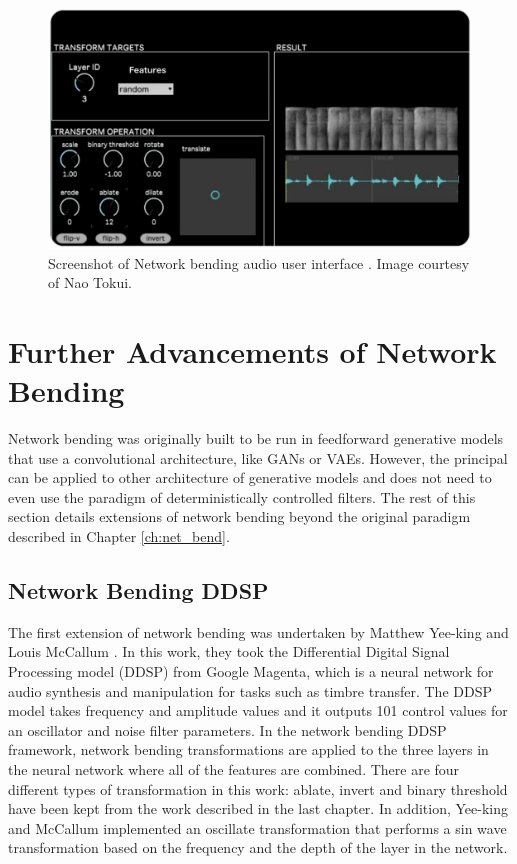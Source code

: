 \begin{figure}[!htb]
    \centering
    \captionsetup{justification=centering}
    \includegraphics[width=1\textwidth]{figures/c7_impact/net-bend-technical/nao-tokui-stylegan-audio.png}
    \caption[Network bending audio user interface]{Screenshot of Network bending audio user interface \citep{tokui2023bending}. Image courtesy of Nao Tokui.}
    \label{fig:c7:net-bend-nao-tokui}
\end{figure}

\section{Further Advancements of Network Bending}

Network bending was originally built to be run in feedforward generative models that use a convolutional architecture, like GANs or VAEs. 
However, the principal can be applied to other architecture of generative models and does not need to even use the paradigm of deterministically controlled filters. 
The rest of this section details extensions of network bending beyond the original paradigm described in Chapter \ref{ch:net_bend}.

\subsection{Network Bending DDSP}
\label{c7:subsubsec:ddsp}


The first extension of network bending was undertaken by Matthew Yee-king and Louis McCallum \citep{mccallum2020network,yee2021studio}. 
In this work, they took the Differential Digital Signal Processing model (DDSP) from Google Magenta, which is a neural network for audio synthesis and manipulation for tasks such as timbre transfer. 
The DDSP model takes frequency and amplitude values and it outputs 101 control values for an oscillator and noise filter parameters. 
In the network bending DDSP framework, network bending transformations are applied to the three layers in the neural network where all of the features are combined. 
There are four different types of transformation in this work: ablate, invert and binary threshold have been kept from the work described in the last chapter.
 In addition, Yee-king and McCallum implemented an oscillate transformation that performs a sin wave transformation based on the frequency and the depth of the layer in the network. 

